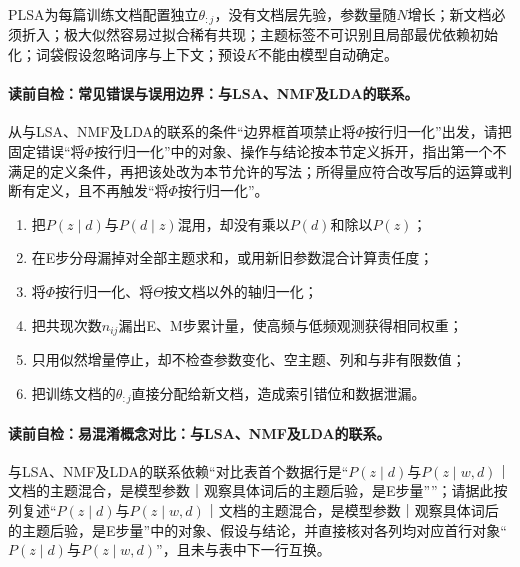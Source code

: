 \label{struct:V4-C06-CH29}
\begin{notapplicablebox}[title=\SLMethodLimitationsTitle]
PLSA为每篇训练文档配置独立$\theta_{:j}$，没有文档层先验，参数量随$N$增长；新文档必须折入；极大似然容易过拟合稀有共现；主题标签不可识别且局部最优依赖初始化；词袋假设忽略词序与上下文；预设$K$不能由模型自动确定。
\end{notapplicablebox}

\label{struct:V4-C06-CH30}
\paragraph{读前自检：常见错误与误用边界：与LSA、NMF及LDA的联系。}从与LSA、NMF及LDA的联系的条件“边界框首项禁止将$\Phi$按行归一化”出发，请把固定错误“将$\Phi$按行归一化”中的对象、操作与结论按本节定义拆开，指出第一个不满足的定义条件，再把该处改为本节允许的写法；所得量应符合改写后的运算或判断有定义，且不再触发“将$\Phi$按行归一化”。\par

\begin{warningbox}
\begin{enumerate}[leftmargin=2.2em]
  \item 把$P(z\mid d)$与$P(d\mid z)$混用，却没有乘以$P(d)$和除以$P(z)$；
  \item 在E步分母漏掉对全部主题求和，或用新旧参数混合计算责任度；
  \item 将$\Phi$按行归一化、将$\Theta$按文档以外的轴归一化；
  \item 把共现次数$n_{ij}$漏出E、M步累计量，使高频与低频观测获得相同权重；
  \item 只用似然增量停止，却不检查参数变化、空主题、列和与非有限数值；
  \item 把训练文档的$\theta_{:j}$直接分配给新文档，造成索引错位和数据泄漏。
\end{enumerate}
\end{warningbox}

\label{struct:V4-C06-CH31}
\paragraph{读前自检：易混淆概念对比：与LSA、NMF及LDA的联系。}与LSA、NMF及LDA的联系依赖“对比表首个数据行是“$P(z\mid d)$与$P(z\mid w,d)$｜文档的主题混合，是模型参数｜观察具体词后的主题后验，是E步量””；请据此按列复述“$P(z\mid d)$与$P(z\mid w,d)$｜文档的主题混合，是模型参数｜观察具体词后的主题后验，是E步量”中的对象、假设与结论，并直接核对各列均对应首行对象“$P(z\mid d)$与$P(z\mid w,d)$”，且未与表中下一行互换。\par

